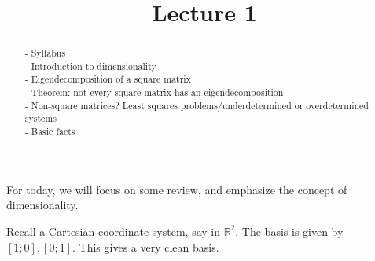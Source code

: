 \documentclass{ximera}
\begin{document}
    \title{Lecture 1}
    
    \begin{abstract} 
    - Syllabus \\
    - Introduction to dimensionality \\
    - Eigendecomposition of a square matrix \\
    - Theorem: not every square matrix has an eigendecomposition\\
    - Non-square matrices? Least squares problems/underdetermined or overdetermined systems \\
    - Basic facts
    \end{abstract}
    \maketitle


For today, we will focus on some review, and emphasize the concept of dimensionality.

Recall a Cartesian coordinate system, say in $\mathbb{R}^2$.  The basis is given by $[1;0], [0;1]$.  This gives a very clean basis.  
\end{document}
